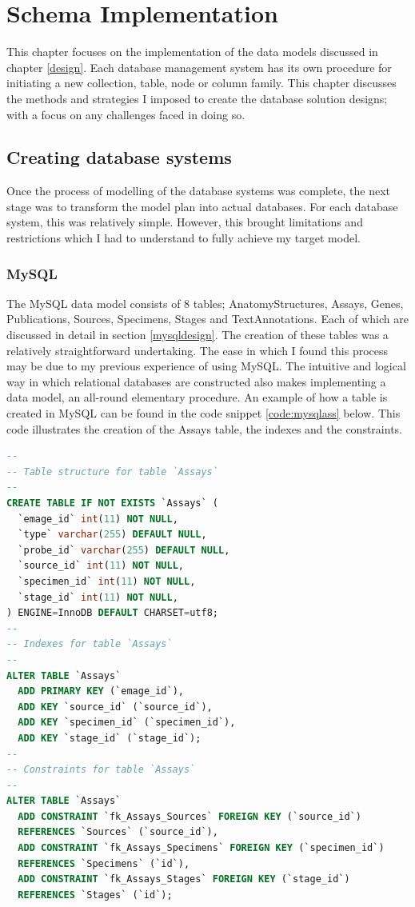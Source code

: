 \chapter{Schema Implementation}\label{implementation}
This chapter focuses on the implementation of the data models discussed in chapter \ref{design}. Each database management system has its own procedure for initiating a new collection, table, node or column family. This chapter discusses the methods and strategies I imposed to create the database solution designs; with a focus on any challenges faced in doing so.

\section{Creating database systems}\label{dbcreate}
Once the process of modelling of the database systems was complete, the next stage was to transform the model plan into actual databases. For each database system, this was relatively simple. However, this brought limitations and restrictions which I had to understand to fully achieve my target model.

\subsection{MySQL}
The MySQL data model consists of 8 tables; AnatomyStructures, Assays, Genes, Publications, Sources, Specimens, Stages and TextAnnotations. Each of which are discussed in detail in section \ref{mysqldesign}. The creation of these tables was a relatively straightforward undertaking. The ease in which I found this process may be due to my previous experience of using MySQL. The intuitive and logical way in which relational databases are constructed also makes implementing a data model, an all-round elementary procedure. An example of how a table is created in MySQL can be found in the code snippet \ref{code:mysqlass} below. This code illustrates the creation of the Assays table, the indexes and the constraints.
\newpage
\vspace*{\fill}
\begin{lstlisting}[language=SQL, caption=Creation of Assays table in MySQL., label=code:mysqlass]
--
-- Table structure for table `Assays`
--
CREATE TABLE IF NOT EXISTS `Assays` (
  `emage_id` int(11) NOT NULL,
  `type` varchar(255) DEFAULT NULL,
  `probe_id` varchar(255) DEFAULT NULL,
  `source_id` int(11) NOT NULL,
  `specimen_id` int(11) NOT NULL,
  `stage_id` int(11) NOT NULL,
) ENGINE=InnoDB DEFAULT CHARSET=utf8;
--
-- Indexes for table `Assays`
--
ALTER TABLE `Assays`
  ADD PRIMARY KEY (`emage_id`),
  ADD KEY `source_id` (`source_id`),
  ADD KEY `specimen_id` (`specimen_id`),
  ADD KEY `stage_id` (`stage_id`);
--
-- Constraints for table `Assays`
--
ALTER TABLE `Assays`
  ADD CONSTRAINT `fk_Assays_Sources` FOREIGN KEY (`source_id`)
  REFERENCES `Sources` (`source_id`),
  ADD CONSTRAINT `fk_Assays_Specimens` FOREIGN KEY (`specimen_id`)
  REFERENCES `Specimens` (`id`),
  ADD CONSTRAINT `fk_Assays_Stages` FOREIGN KEY (`stage_id`)
  REFERENCES `Stages` (`id`);
\end{lstlisting}
\vspace*{\fill}
\newpage


